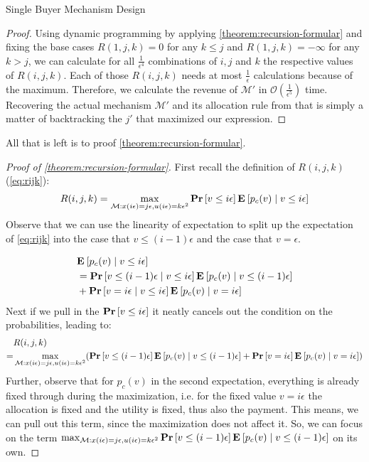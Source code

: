 \documentclass[11pt,a4paper]{article}
\renewcommand{\Pr}[1]{\mbox{\rm\bf Pr}\left[#1\right]}
\newcommand{\Ex}[2][]{\mbox{\rm\bf E}_{#1}\left[#2\right]}
\newcommand{\1}[1]{\mbox{\rm\bf 1}_{#1}}
\begin{document}
\begin{section}{Single Buyer Mechanism Design}
\begin{proof}
     Using dynamic programming by applying \autoref{theorem:recursion-formular} and fixing the base cases $R(1,j,k) = 0$ for any $k \leq j$ and $R(1,j,k)=-\infty$ for any $k > j$,
     we can calculate for all $\frac{1}{\epsilon^4}$ combinations of $i,j$ and $k$ the respective values of $R(i,j,k)$.
     Each of those $R(i,j,k)$ needs at most $\frac{1}{\epsilon}$ calculations because of the maximum.
     Therefore, we calculate the revenue of $\mathcal{M}'$ in $\mathcal{O}\left(\frac{1}{\epsilon^5}\right)$ time.
     Recovering the actual mechanism $\mathcal{M}'$ and its allocation rule from that is simply a matter of backtracking the $j'$ that maximized our expression.
 \end{proof}

 All that is left is to proof \autoref{theorem:recursion-formular}.
 \begin{proof}[Proof of \autoref{theorem:recursion-formular}]
     First recall the definition of $R(i,j,k)$ (\autoref{eq:rijk}):
     \begin{align*}
         R(i,j,k) = \max_{\mathcal{M}: x(i\epsilon) = j\epsilon, u(i\epsilon) = k \epsilon^2} \Pr{v \leq i\epsilon}\Ex{p_c(v)\mid v \leq i \epsilon}
     \end{align*}
     Observe that we can use the linearity of expectation to split up the expectation of \autoref{eq:rijk} into the case that $v \leq (i-1)\epsilon$ and the case that $v = \epsilon$.

     \begin{align*}
          & \Ex{p_c(v)\mid v \leq i \epsilon}                                                           \\
          & = \Pr{v \leq (i-1)\epsilon \mid v \leq i \epsilon} \Ex{p_c(v) \mid v \leq (i - 1) \epsilon} \\
          & + \Pr{v = i \epsilon \mid v \leq i \epsilon} \Ex{p_c(v) \mid v = i \epsilon}
     \end{align*}
     Next if we pull in the $\Pr{v \leq i\epsilon}$ it neatly cancels out the condition on the probabilities, leading to:
     \begin{align*}
           & R(i,j,k)                                                                                                                                                                                             \\
         = & \max_{\mathcal{M}: x(i\epsilon) = j\epsilon, u(i\epsilon) = k \epsilon^2} (\Pr{v \leq (i-1)\epsilon} \Ex{p_c(v) \mid v \leq (i - 1) \epsilon} + \Pr{v = i \epsilon} \Ex{p_c(v) \mid v = i \epsilon})
     \end{align*}
     Further, observe that for $p_c(v)$ in the second expectation, everything is already fixed through during the maximization, i.e. for the fixed value $v = i \epsilon$ the allocation is fixed and the utility is fixed, thus also the payment.
     This means, we can pull out this term, since the maximization does not affect it.
     So, we can focus on the term $\max_{\mathcal{M}: x(i\epsilon) = j\epsilon, u(i\epsilon)=k\epsilon^2} \Pr{v \leq (i-1)\epsilon} \Ex{p_c(v) \mid v \leq (i - 1) \epsilon}$ on its own.


\end{proof}
\end{section}
\end{document}
